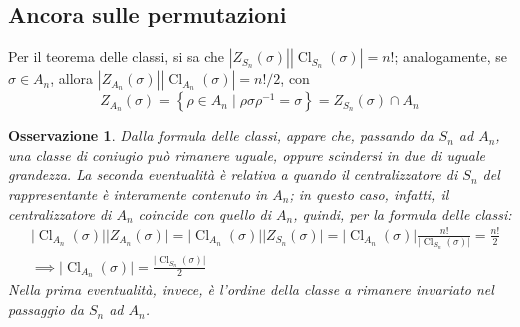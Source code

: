 \documentclass[11pt]{scrartcl}
\theoremstyle{style1}
\newtheorem{osservazione}{Osservazione}[section]
\numberwithin{equation}{subsection}
\begin{document}
\subsection{Ancora sulle permutazioni}
Per il teorema delle classi, si sa che $|Z_{S_n} (\sigma )| |\operatorname{Cl}_{S_n}  (\sigma )| = n!$; analogamente, se $\sigma  \in A_n$, allora $|Z_{A_n} (\sigma )| |\operatorname{Cl} _{A_n} (\sigma )| = n! / 2$, con
\[
Z_{A_n} (\sigma ) = \left\{ \rho \in A_n  \mid \rho \sigma \rho ^{-1}= \sigma  \right\} = Z_{S_n} (\sigma ) \cap A_n
\] 
\begin{osservazione}
Dalla formula delle classi, appare che, passando da $S_n$ ad $A_n$, una classe di coniugio pu\`o rimanere uguale, oppure scindersi in due di uguale grandezza.
La seconda eventualit\`a \`e relativa a quando il centralizzatore di $S_n$ del rappresentante \`e interamente contenuto in $A_n$; in questo caso, infatti, il centralizzatore di $A_n$ coincide con quello di $A_n$, quindi, per la formula delle classi:
\[
	\begin{split}
		&\lvert \operatorname{Cl} _{A_n} (\sigma ) \rvert \lvert Z_{A_n} (\sigma ) \rvert =\lvert \operatorname{Cl} _{A_n} (\sigma ) \rvert \lvert Z_{S_n} (\sigma ) \rvert  =\lvert \operatorname{Cl} _{A_n} (\sigma ) \rvert \frac{n!}{\lvert \operatorname{Cl} _{S_n} (\sigma ) \rvert}  =\frac{n!}{2} \\
		&\implies \lvert \operatorname{Cl} _{A_n} (\sigma ) \rvert=\frac{\lvert \operatorname{Cl} _{S_n} (\sigma ) \rvert}{2}
	\end{split}
\] 
Nella prima eventualit\`a, invece, \`e l'ordine della classe a rimanere invariato nel passaggio da $S_n$ ad $A_n$.
\end{osservazione}
\end{document}
